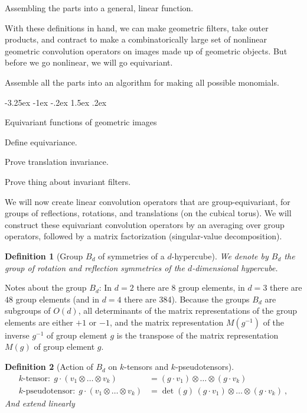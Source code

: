 \documentclass{article}
\makeatletter
\theoremstyle{plain}
\newtheorem{definition}{Definition}
\renewcommand\section{\@startsection {section}{1}{\z@}%
  {-3.25ex \@plus -1ex \@minus -.2ex}%
  {1.5ex \@plus .2ex}%
  {\raggedright\normalfont\large\bfseries}}
\makeatother
\begin{document}
Assembling the parts into a general, linear function.



With these definitions in hand, we can make geometric filters, take outer products, and contract to make a combinatorically large set of nonlinear geometric convolution operators on images made up of geometric objects.
But before we go nonlinear, we will go equivariant.

Assemble all the parts into an algorithm for making all possible monomials.

\section{Equivariant functions of geometric images}\label{sec:equivariant}

Define equivariance.

Prove translation invariance.

Prove thing about invariant filters.

We will now create linear convolution operators that are group-equivariant, for groups of reflections, rotations, and translations (on the cubical torus).
We will construct these equivariant convolution operators by an averaging over group operators, followed by a matrix factorization (singular-value decomposition).

\begin{definition}[Group $B_d$ of symmetries of a $d$-hypercube]
We denote by $B_d$ the group of rotation and reflection symmetries of the $d$-dimensional hypercube.
\end{definition}

Notes about the group $B_d$: In $d=2$ there are $8$ group elements, in $d=3$ there are $48$ group elements (and in $d=4$ there are 384). Because the groups $B_d$ are subgroups of $O(d)$, all determinants of the matrix representations of the group elements are either $+1$ or $-1$, and the matrix representation $M(g^{-1})$ of the inverse $g^{-1}$ of group element $g$ is the transpose of the matrix representation $M(g)$ of group element $g$.

\begin{definition}[Action of $B_d$ on $k$-tensors and $k$-pseudotensors]
\begin{align}
\mbox{$k$-tensor:} ~~ g\cdot(v_1 \otimes \ldots \otimes v_k) &= (g\cdot v_1)\otimes\ldots\otimes(g\cdot v_k) \\
\mbox{$k$-pseudotensor:} ~~ g\cdot(v_1 \otimes \ldots \otimes v_k) &= \det(g)\,(g\cdot v_1)\otimes\ldots\otimes(g\cdot v_k) ~,
\end{align}
And extend linearly
\end{definition}
\end{document}
